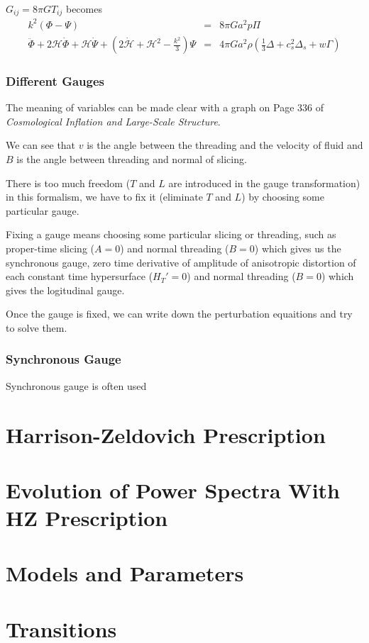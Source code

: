 \documentclass[12pt,a4paper]{book}
\begin{document}
$G_{ij} = 8\pi G T_{ij}$ becomes
\begin{eqnarray}
	k^2(\Phi - \Psi) &=& 8\pi G a^2 p \Pi \\
	\ddot \Phi + 2\mathcal H \dot \Phi + \mathcal H \dot \Psi + (2\dot {\mathcal H} + \mathcal H^2 - \frac{k^2}{3} )\Psi &=& 4\pi G a^2 \rho (\frac13 \Delta + c_s^2 \Delta_s + w \Gamma)
\end{eqnarray}


\subsubsection{Different Gauges}

The meaning of variables can be made clear with a graph on Page 336 of \emph{Cosmological Inflation and Large-Scale Structure}.

We can see that $v$ is the angle between the threading and the velocity of fluid and $B$ is the angle between threading and normal of slicing.

There is too much freedom ($T$ and $L$ are introduced in the gauge transformation) in this formalism, we have to fix it (eliminate $T$ and $L$) by choosing some particular gauge.

Fixing a gauge means choosing some particular slicing or threading, such as proper-time slicing ($A=0$) and normal threading ($B=0$) which gives us the synchronous gauge, zero time derivative of amplitude of anisotropic distortion of each constant time hypersurface ($H_T' = 0$) and normal threading ($B=0$) which gives the logitudinal gauge.


Once the gauge is fixed, we can write down the perturbation equaitions and try to solve them.




\subsubsection{Synchronous Gauge}


Synchronous gauge is often used





\section{Harrison-Zeldovich Prescription}






\section{Evolution of Power Spectra With HZ Prescription}





\section{Models and Parameters}




\section{Transitions}
\end{document}
